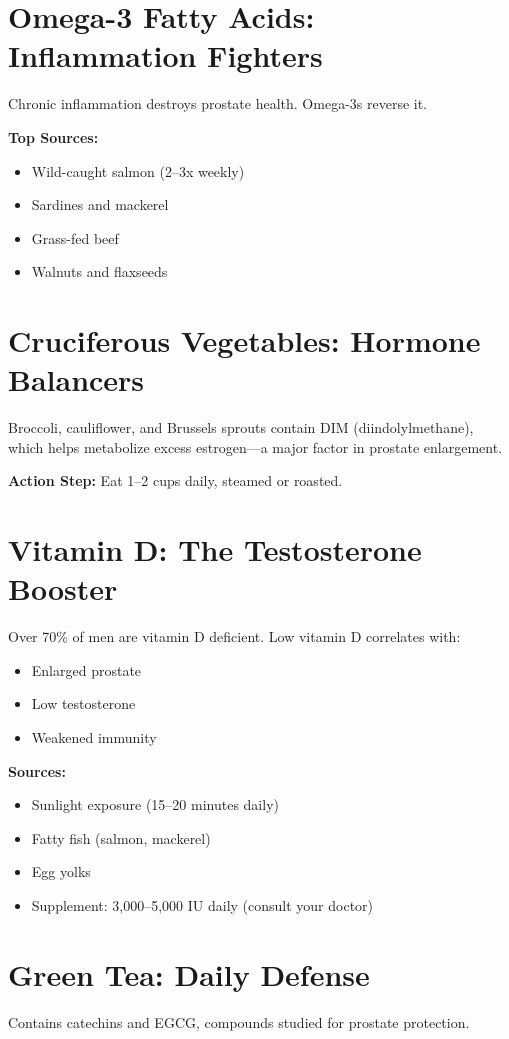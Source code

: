\documentclass[11pt,oneside,openany]{book}
\begin{document}
\section*{Omega-3 Fatty Acids: Inflammation Fighters}
Chronic inflammation destroys prostate health. Omega-3s reverse it.

\textbf{Top Sources:}
\begin{itemize}[leftmargin=*]
\item Wild-caught salmon (2--3x weekly)
\item Sardines and mackerel
\item Grass-fed beef
\item Walnuts and flaxseeds
\end{itemize}

\section*{Cruciferous Vegetables: Hormone Balancers}
Broccoli, cauliflower, and Brussels sprouts contain DIM (diindolylmethane), which helps metabolize excess estrogen---a major factor in prostate enlargement.

\textbf{Action Step:} Eat 1--2 cups daily, steamed or roasted.

\section*{Vitamin D: The Testosterone Booster}
Over 70\% of men are vitamin D deficient. Low vitamin D correlates with:
\begin{itemize}[leftmargin=*]
\item Enlarged prostate
\item Low testosterone
\item Weakened immunity
\end{itemize}

\textbf{Sources:}
\begin{itemize}[leftmargin=*]
\item Sunlight exposure (15--20 minutes daily)
\item Fatty fish (salmon, mackerel)
\item Egg yolks
\item Supplement: 3,000--5,000 IU daily (consult your doctor)
\end{itemize}

\section*{Green Tea: Daily Defense}
Contains catechins and EGCG, compounds studied for prostate protection.
\end{document}
